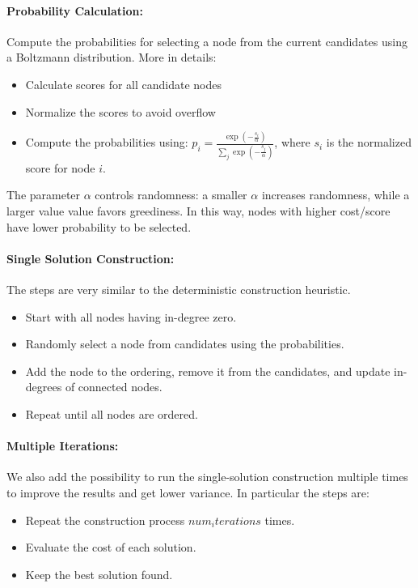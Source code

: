 \documentclass{article}
\begin{document}
\paragraph{Probability Calculation:}
Compute the probabilities for selecting a node from the current candidates using a Boltzmann distribution. More in details:
\begin{itemize}
    \item Calculate scores for all candidate nodes
    \item Normalize the scores to avoid overflow
    \item Compute the probabilities using: 
    \(p_i = \frac{\exp{(-\frac{s_i}{\alpha})}}{\sum_j \exp{(-\frac{s_j}{\alpha})}}\), where \(s_i\) is the normalized score for node \( i\).
\end{itemize}
The parameter $\alpha$ controls randomness: a smaller $\alpha$ increases randomness, while a larger value value favors greediness.
In this way, nodes with higher cost/score have lower probability to be selected.

\paragraph{Single Solution Construction:}
The steps are very similar to the deterministic construction heuristic.
\begin{itemize}
    \item Start with all nodes having in-degree zero.
    \item Randomly select a node from candidates using the probabilities.
    \item Add the node to the ordering, remove it from the candidates, and update in-degrees of connected nodes.
    \item Repeat until all nodes are ordered.
\end{itemize}


\paragraph{Multiple Iterations:}
We also add the possibility to run the single-solution construction multiple times to improve the results and get lower variance. In particular the steps are:
\begin{itemize}
    \item Repeat the construction process $num_iterations$ times.
    \item Evaluate the cost of each solution.
    \item Keep the best solution found.
\end{itemize}
\end{document}
